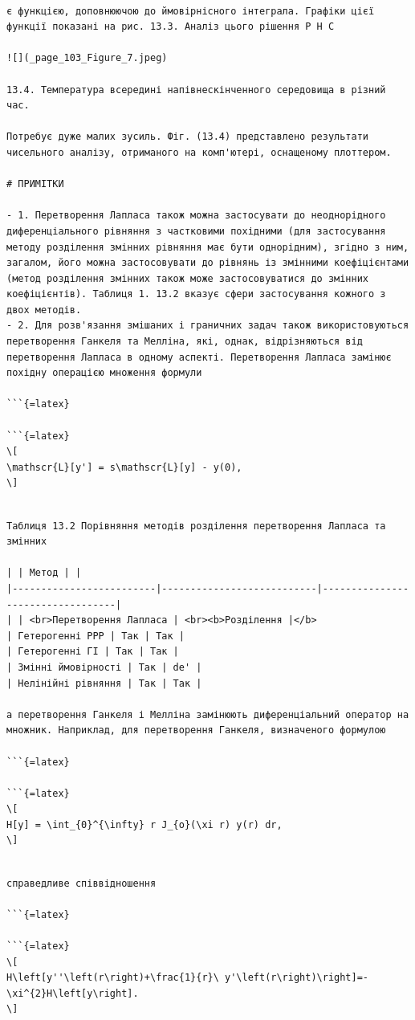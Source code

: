 \documentclass[
]{article}
\begin{document}
\begin{verbatim}

є функцією, доповнюючою до ймовірнісного інтеграла. Графіки цієї функції показані на рис. 13.3. Аналіз цього рішення P H C

![](_page_103_Figure_7.jpeg)

13.4. Температура всередині напівнескінченного середовища в різний час.

Потребує дуже малих зусиль. Фіг. (13.4) представлено результати чисельного аналізу, отриманого на комп'ютері, оснащеному плоттером.

# ПРИМІТКИ

- 1. Перетворення Лапласа також можна застосувати до неоднорідного диференціального рівняння з частковими похідними (для застосування методу розділення змінних рівняння має бути однорідним), згідно з ним, загалом, його можна застосовувати до рівнянь із змінними коефіцієнтами (метод розділення змінних також може застосовуватися до змінних коефіцієнтів). Таблиця 1. 13.2 вказує сфери застосування кожного з двох методів.
- 2. Для розв'язання змішаних і граничних задач також використовуються перетворення Ганкеля та Мелліна, які, однак, відрізняються від перетворення Лапласа в одному аспекті. Перетворення Лапласа замінює похідну операцією множення формули

```{=latex}

```{=latex}
\[
\mathscr{L}[y'] = s\mathscr{L}[y] - y(0),
\]
\end{verbatim}

\begin{verbatim}

Таблиця 13.2 Порівняння методів розділення перетворення Лапласа та змінних

| | Метод | |
|-------------------------|---------------------------|----------------------------------|
| | <br>Перетворення Лапласа | <br><b>Розділення |</b>
| Гетерогенні PPP | Так | Так |
| Гетерогенні ГІ | Так | Так |
| Змінні ймовірності | Так | de' |
| Нелінійні рівняння | Так | Так |

а перетворення Ганкеля і Мелліна замінюють диференціальний оператор на множник. Наприклад, для перетворення Ганкеля, визначеного формулою

```{=latex}

```{=latex}
\[
H[y] = \int_{0}^{\infty} r J_{o}(\xi r) y(r) dr,
\]
\end{verbatim}

\begin{verbatim}

справедливе співвідношення

```{=latex}

```{=latex}
\[
H\left[y''\left(r\right)+\frac{1}{r}\ y'\left(r\right)\right]=-\xi^{2}H\left[y\right].
\]
\end{verbatim}
\end{document}

